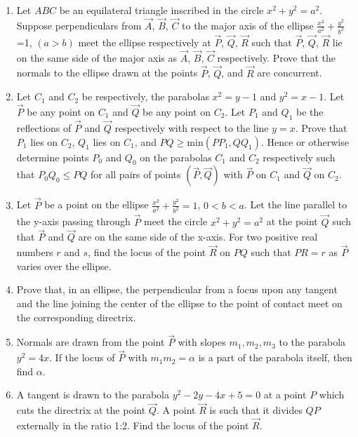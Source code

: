 \documentclass[journal]{IEEEtran}
\numberwithin{equation}{enumi}
\numberwithin{figure}{enumi}
\begin{document}
\begin{enumerate}
\item Let $ABC$ be an equilateral triangle inscribed in the circle $x^2+y^2=a^2$. Suppose perpendiculars from $\vec{A}$, $\vec{B}$, $\vec{C}$ to the major axis of the ellipse $\frac{x^2}{a^2}+\frac{y^2}{b^2}$=1, $(a>b)$ meet the ellipse respectively at $\vec{P}$, $\vec{Q}$, $\vec{R}$ such that $\vec{P}$, $\vec{Q}$, $\vec{R}$ lie on the same side of the major axis as $\vec{A}$, $\vec{B}$, $\vec{C}$ respectively. Prove that the normals to the ellipse drawn at the points $\vec{P}$, $\vec{Q}$, and $\vec{R}$ are concurrent. \hfill{}

\item Let $C_1$ and $C_2$ be respectively, the parabolas $x^2=y-1$ and $y^2=x-1$. Let $\vec{P}$ be any point on $C_1$ and $\vec{Q}$ be any point on $C_2$. Let $P_1$ and $Q_1$ be the reflections of $\vec{P}$ and $\vec{Q}$ respectively with respect to the line $y=x$. Prove that $P_1$ lies on $C_2$, $Q_1$ lies on $C_1$, and $PQ \geq \text{min}({PP_1, QQ_1})$. Hence or otherwise determine points $P_0$ and $Q_0$ on the parabolas $C_1$ and $C_2$ respectively such that $P_0Q_0 \leq PQ$ for all pairs of points $(\vec{P},\vec{Q})$ with $\vec{P}$ on $C_1$ and $\vec{Q}$ on $C_2$. \hfill{}

\item Let $\vec{P}$ be a point on the ellipse $\frac{x^2}{a^2}+\frac{y^2}{b^2}=1$, $0<b<a$. Let the line parallel to the y-axis passing through $\vec{P}$ meet the circle $x^2+y^2=a^2$ at the point $\vec{Q}$ such that $\vec{P}$ and $\vec{Q}$ are on the same side of the x-axis. For two positive real numbers $r$ and $s$, find the locus of the point $\vec{R}$ on $PQ$ such that $PR
= r$ as $\vec{P}$ varies over the ellipse. \hfill{}

\item Prove that, in an ellipse, the perpendicular from a focus upon any tangent and the line joining the center of the ellipse to the point of contact meet on the corresponding directrix. \hfill{}

\item Normals are drawn from the point $\vec{P}$ with slopes $m_1, m_2, m_3$ to the parabola $y^2=4x$. If the locus of $\vec{P}$ with $m_1m_2=\alpha$ is a part of the parabola itself, then find $\alpha$. \hfill{}

\item A tangent is drawn to the parabola $y^2-2y-4x+5=0$ at a point $P$ which cuts the directrix at the point $\vec{Q}$. A point $\vec{R}$ is such that it divides $QP$ externally in the ratio 1:2. Find the locus of the point $\vec{R}$. \hfill{}


\end{enumerate}
\end{document}
